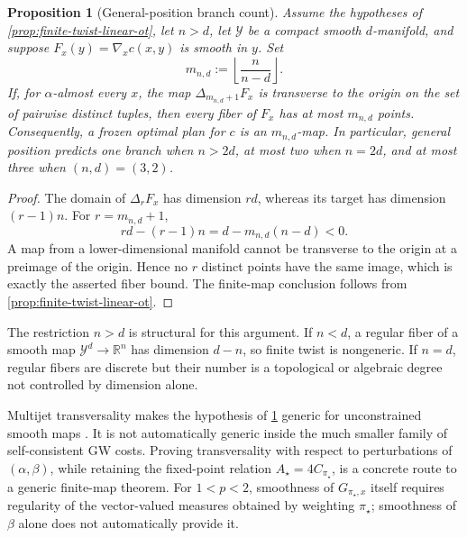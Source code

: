 \documentclass[11pt,a4paper]{article}
\newtheorem{proposition}[theorem]{Proposition}
\theoremstyle{definition}
\theoremstyle{remark}
\newcommand{\R}{\mathbb R}
\begin{document}
\begin{proposition}[General-position branch count]
\label{prop:general-position-branch-count}
Assume the hypotheses of \cref{prop:finite-twist-linear-ot}, let \(n>d\),
let \(\mathcal Y\) be a compact smooth \(d\)-manifold, and suppose
\(F_x(y)=\nabla_xc(x,y)\) is smooth in \(y\).  Set
\begin{equation}
  m_{n,d}:=\left\lfloor\frac{n}{n-d}\right\rfloor.
  \label{eq:generic-branch-number}
\end{equation}
If, for \(\alpha\)-almost every \(x\), the map
\(\Delta_{m_{n,d}+1}F_x\) is transverse to the origin on the set of pairwise
distinct tuples, then every fiber of \(F_x\) has at most \(m_{n,d}\) points.
Consequently, a frozen optimal plan for \(c\) is an
\(m_{n,d}\)-map.  In particular, general position predicts one branch when
\(n>2d\), at most two when \(n=2d\), and at most three when \((n,d)=(3,2)\).
\end{proposition}

\begin{proof}
The domain of \(\Delta_rF_x\) has dimension \(rd\), whereas its target has
dimension \((r-1)n\).  For \(r=m_{n,d}+1\),
\[
  rd-(r-1)n=d-m_{n,d}(n-d)<0.
\]
A map from a lower-dimensional manifold cannot be transverse to the origin at
a preimage of the origin.  Hence no \(r\) distinct points have the same
image, which is exactly the asserted fiber bound.  The finite-map conclusion
follows from \cref{prop:finite-twist-linear-ot}.
\end{proof}

The restriction \(n>d\) is structural for this argument.  If \(n<d\), a
regular fiber of a smooth map \(\mathcal Y^d\to\R^n\) has dimension
\(d-n\), so finite twist is nongeneric.  If \(n=d\), regular fibers are
discrete but their number is a topological or algebraic degree not controlled
by dimension alone.

Multijet transversality makes the hypothesis of
\cref{prop:general-position-branch-count} generic for unconstrained smooth
maps \citep{GolubitskyGuillemin1973}.  It is not automatically generic inside
the much smaller family of self-consistent GW costs.  Proving transversality
with respect to perturbations of \((\alpha,\beta)\), while retaining the
fixed-point relation \(A_\star=4C_{\pi_\star}\), is a concrete route to a
generic finite-map theorem.  For \(1<p<2\), smoothness of
\(G_{\pi_\star,x}\) itself requires regularity of the vector-valued measures
obtained by weighting \(\pi_\star\); smoothness of \(\beta\) alone does not
automatically provide it.
\end{document}
